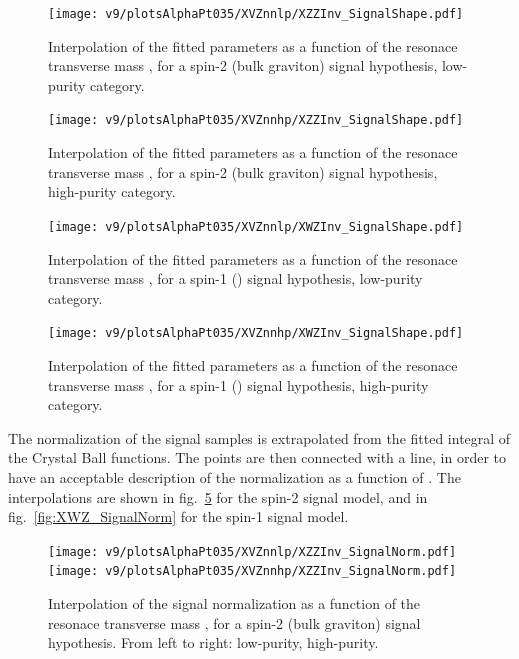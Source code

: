 \begin{figure}[!htb]
  \centering
    \texttt{[image: v9/plotsAlphaPt035/XVZnnlp/XZZInv\_SignalShape.pdf]}
  \caption{Interpolation of the fitted parameters as a function of the resonace transverse mass \mtVZ, for a spin-2 (bulk graviton) signal hypothesis, low-purity category.}
  \label{fig:XZZ_SignalShapeLP}
\end{figure}

\begin{figure}[!htb]
  \centering
    \texttt{[image: v9/plotsAlphaPt035/XVZnnhp/XZZInv\_SignalShape.pdf]}

  \caption{Interpolation of the fitted parameters as a function of the resonace transverse mass \mtVZ, for a spin-2 (bulk graviton) signal hypothesis, high-purity category.}
  \label{fig:XZZ_SignalShapeHP}
\end{figure}

\begin{figure}[!htb]
  \centering
    \texttt{[image: v9/plotsAlphaPt035/XVZnnlp/XWZInv\_SignalShape.pdf]}
  \caption{Interpolation of the fitted parameters as a function of the resonace transverse mass \mtVZ, for a spin-1 (\Wp) signal hypothesis, low-purity category.}
  \label{fig:XWZ_SignalShapeLP}
\end{figure}

\begin{figure}[!htb]
  \centering
    \texttt{[image: v9/plotsAlphaPt035/XVZnnhp/XWZInv\_SignalShape.pdf]}

  \caption{Interpolation of the fitted parameters as a function of the resonace transverse mass \mtVZ, for a spin-1 (\Wp) signal hypothesis, high-purity category.}
  \label{fig:XWZ_SignalShapeHP}
\end{figure}


\noindent The normalization of the signal samples is extrapolated from the fitted integral of the Crystal Ball functions. The points are then connected with a line, in order to have an acceptable description of the normalization as a function of \mtVZ. The interpolations are shown in fig.~\ref{fig:XZZ_SignalNorm} for the spin-2 signal model, and in fig.~\ref{fig:XWZ_SignalNorm} for the spin-1 signal model.%

\begin{figure}[!htb]
  \centering
    \texttt{[image: v9/plotsAlphaPt035/XVZnnlp/XZZInv\_SignalNorm.pdf]}
    \texttt{[image: v9/plotsAlphaPt035/XVZnnhp/XZZInv\_SignalNorm.pdf]}
  \caption{Interpolation of the signal normalization as a function of the resonace transverse mass \mtVZ, for a spin-2 (bulk graviton) signal hypothesis. From left to right: low-purity, high-purity.}
  \label{fig:XZZ_SignalNorm}
\end{figure}

